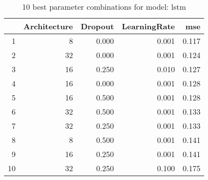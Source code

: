 \begin{table}[ht]
\centering
\begin{tabular}{rrrrr}
  \hline
 & Architecture & Dropout & LearningRate & mse \\ 
  \hline
1 &    8 & 0.000 & 0.001 & 0.117 \\ 
  2 &   32 & 0.000 & 0.001 & 0.124 \\ 
  3 &   16 & 0.250 & 0.010 & 0.127 \\ 
  4 &   16 & 0.000 & 0.001 & 0.128 \\ 
  5 &   16 & 0.500 & 0.001 & 0.128 \\ 
  6 &   32 & 0.500 & 0.001 & 0.133 \\ 
  7 &   32 & 0.250 & 0.001 & 0.133 \\ 
  8 &    8 & 0.500 & 0.001 & 0.141 \\ 
  9 &   16 & 0.250 & 0.001 & 0.141 \\ 
  10 &   32 & 0.250 & 0.100 & 0.175 \\ 
   \hline
\end{tabular}
\caption{10 best parameter combinations for model: lstm} 
\label{tab:lstm_top_10}
\end{table}
